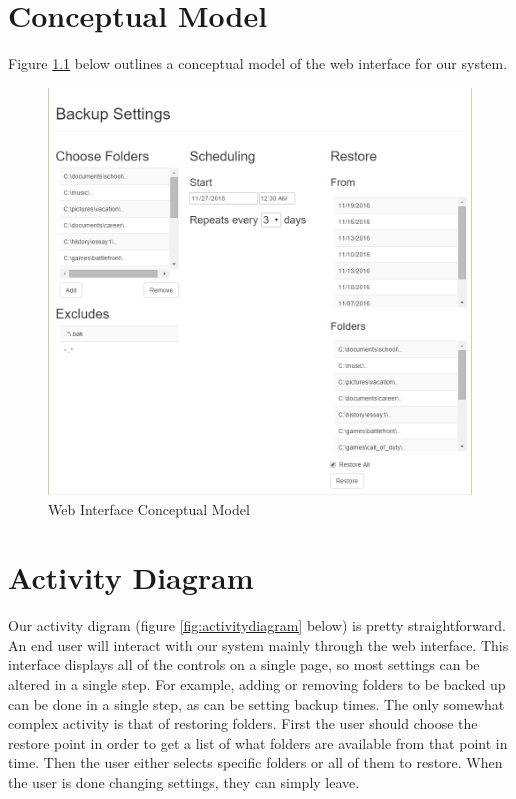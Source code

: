 \chapter{Conceptual Model}

Figure \ref{fig:mockup} below outlines a conceptual model of the web interface for our system.

\begin{figure}[h]
	\centering
\includegraphics[scale=0.45]{images/mockup.png}
	\caption{Web Interface Conceptual Model}
	\label{fig:mockup}
\end{figure}

\chapter{Activity Diagram}

Our activity digram (figure \ref{fig:activitydiagram} below) is pretty straightforward.  An end user will interact with our system mainly through the web interface.  This interface displays all of the controls on a single page, so most settings can be altered in a single step.  For example, adding or removing folders to be backed up can be done in a single step, as can be setting backup times.  The only somewhat complex activity is that of restoring folders.  First the user should choose the restore point in order to get a list of what folders are available from that point in time.  Then the user either selects specific folders or all of them to restore.  When the user is done changing settings, they can simply leave.

